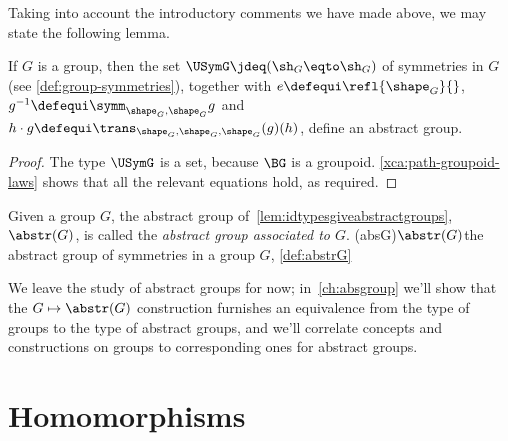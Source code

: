 Taking into account the introductory comments we have made above, we may state the following lemma.

\begin{lemma}\label{lem:idtypesgiveabstractgroups}
  If $G$ is a group, then the set $\USymG \jdeq (\sh_G\eqto\sh_G)$
  of symmetries in $G$ (see \cref{def:group-symmetries}),
  together with $e\defequi\refl{\shape_G}{}$,
  $g^{-1}\defequi\symm_{\shape_G,\shape_G}g$
  and $h \cdot g \defequi \trans_{\shape_G,\shape_G,\shape_G}(g)(h)$, define an abstract group.
\end{lemma}

\begin{proof}
  The type $\USymG$ is a set, because $\BG$ is a groupoid.
  \cref{xca:path-groupoid-laws} shows that all the relevant equations hold, as required.
\end{proof}

\begin{definition}\label{def:abstrG}
  Given a group $G$, the abstract group of~\cref{lem:idtypesgiveabstractgroups},
  $\abstr(G)$, is called the \emph{abstract group associated to $G$}.%
  \glossary(absG){$\protect\abstr(G)$}{the abstract group of symmetries in a group $G$,
  \cref{def:abstrG}}
\end{definition}

We leave the study of abstract groups for now;
in~\cref{ch:absgroup} we'll
show that the $G \mapsto \abstr(G)$ construction
furnishes an equivalence from the type of groups to the type of abstract groups,
and we'll correlate concepts and constructions on groups
to corresponding ones for abstract groups.

\section{Homomorphisms}
\label{sec:homomorphisms}

